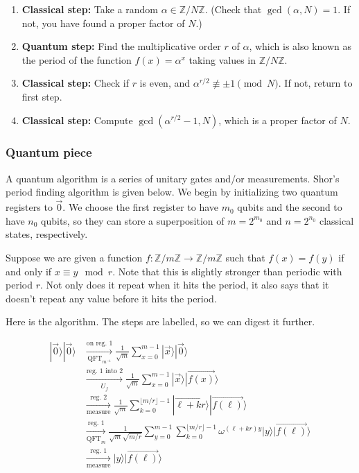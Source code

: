 \documentclass{article}
\theoremstyle{plain}
\theoremstyle{definition}
\theoremstyle{remark}
\numberwithin{theorem}{section}
\newcommand{\ZZ}{\mathbb{Z}}
\begin{document}
\begin{enumerate}
    \item \textbf{Classical step:}  Take a random $\alpha \in \ZZ/N\ZZ$.  (Check that $\gcd(\alpha,N) = 1$.  If not, you have found a proper factor of $N$.)
    \item \textbf{Quantum step:}  Find the multiplicative order $r$ of $\alpha$, which is also known as the period of the function $f(x) = \alpha^x$ taking values in $\ZZ/N\ZZ$.
    \item \textbf{Classical step:}  Check if $r$ is even, and $\alpha^{r/2} \not\equiv \pm 1 \pmod{N}$.  If not, return to first step.
    \item \textbf{Classical step:}  Compute $\gcd(\alpha^{r/2}-1,N)$, which is a proper factor of $N$.
\end{enumerate}

\subsubsection{Quantum piece}

A quantum algorithm is a series of unitary gates and/or measurements.  Shor's period finding algorithm is given below.  We begin by initializing two quantum registers to $\vec{0}$.  We choose the first register to have $m_0$ qubits and the second to have $n_0$ qubits, so they can store a superposition of $m = 2^{m_0}$ and $n=2^{n_0}$ classical states, respectively.

Suppose we are given a function $f: \ZZ/m\ZZ \rightarrow \ZZ/m\ZZ$ such that $f(x) = f(y)$ if and only if $x \equiv y \mod{r}$.  Note that this is slightly stronger than periodic with period $r$.  Not only does it repeat when it hits the period, it also says that it doesn't repeat any value before it hits the period.

Here is the algorithm.  The steps are labelled, so we can digest it further.

\newcommand{\QFT}{\operatorname{QFT}}
\begin{align}
    | \vec{0} \rangle | \vec{0} \rangle
    & \xrightarrow[\QFT_{m^{-1}}]{\text{on reg. 1}}  \frac{1}{\sqrt{m}}
     \sum_{x=0}^{m-1} | \vec{x} \rangle | \vec{0} \rangle \label{shor:QFT1} \\
     & \xrightarrow[U_f]{\text{reg. 1 into 2}}  \frac{1}{\sqrt{m}}
     \sum_{x=0}^{m-1} | \vec{x} \rangle | \vec{f(x)} \rangle \label{shor:Uf} \\
        & \xrightarrow[\text{measure}]{\text{reg. 2}}  \frac{1}{\sqrt{m}}
     \sum_{k=0}^{\lfloor m/r \rfloor -1} | \vec{\ell+kr} \rangle | \vec{f(\ell)} \rangle \label{shor:msr1} \\
      & \xrightarrow[\QFT_m]{\text{reg. 1}}  \frac{1}{\sqrt{m}\sqrt{m/r}}
      \sum_{y=0}^{m-1}
     \sum_{k=0}^{\lfloor m/r \rfloor -1}  \omega^{(\ell + kr)y} | y \rangle | \vec{f(\ell)} \rangle \label{shor:QFT2} \\
        & \xrightarrow[\text{measure}]{\text{reg. 1}}   | y \rangle  | \vec{f(\ell)} \rangle \label{shor:msr2}
\end{align}
\end{document}
